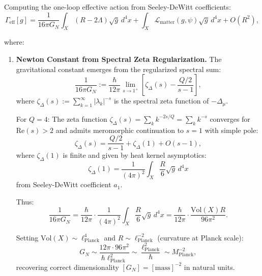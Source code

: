 \begin{theorem}
\label{thm:einsteinHilbertEmergence}
Computing the one-loop effective action from Seeley-DeWitt coefficients:
\begin{equation}
\Gamma_{\text{eff}}[g] = \frac{1}{16\pi G_N} \int_X (R - 2\Lambda) \sqrt{g} \, d^4x + \int_X \mathcal{L}_{\text{matter}}(g, \psi) \sqrt{g} \, d^4x + O(R^2),
\end{equation}

where:

\begin{enumerate}
\item \textbf{Newton Constant from Spectral Zeta Regularization.} The gravitational constant emerges from the regularized spectral sum:
\begin{equation}
\frac{1}{16\pi G_N} := \frac{\hbar}{12\pi} \lim_{s \to 1^+} \left[\zeta_{\Delta}(s) - \frac{Q/2}{s-1}\right],
\end{equation}
where $\zeta_{\Delta}(s) := \sum_{k=1}^\infty |\lambda_k|^{-s}$ is the spectral zeta function of $-\Delta_\mu$.

For $Q = 4$: The zeta function $\zeta_{\Delta}(s) = \sum_k k^{-2s/Q} = \sum_k k^{-s}$ converges for $\text{Re}(s) > 2$ and admits meromorphic continuation to $s = 1$ with simple pole:
\begin{equation}
\zeta_{\Delta}(s) = \frac{Q/2}{s-1} + \zeta_{\Delta}(1) + O(s-1),
\end{equation}
where $\zeta_{\Delta}(1)$ is finite and given by heat kernel asymptotics:
\begin{equation}
\zeta_{\Delta}(1) = \frac{1}{(4\pi)^2} \int_X \frac{R}{6} \sqrt{g} \, d^4x
\end{equation}
from Seeley-DeWitt coefficient $a_1$.

Thus:
\begin{equation}
\frac{1}{16\pi G_N} = \frac{\hbar}{12\pi} \cdot \frac{1}{(4\pi)^2} \int_X \frac{R}{6} \sqrt{g} \, d^4x = \frac{\hbar}{12\pi} \cdot \frac{\text{Vol}(X) R}{96\pi^2}.
\end{equation}

Setting $\text{Vol}(X) \sim \ell_{\text{Planck}}^4$ and $R \sim \ell_{\text{Planck}}^{-2}$ (curvature at Planck scale):
\begin{equation}
G_N \sim \frac{12\pi \cdot 96\pi^2}{\hbar \ell_{\text{Planck}}^2} \sim \frac{\ell_{\text{Planck}}^2}{\hbar} \sim M_{\text{Planck}}^{-2},
\end{equation}
recovering correct dimensionality $[G_N] = [\text{mass}]^{-2}$ in natural units.


\end{enumerate}
\end{theorem}
